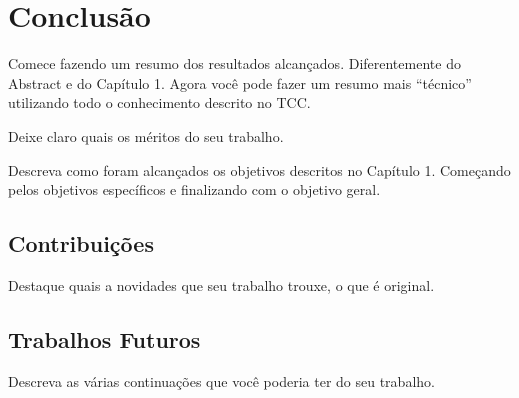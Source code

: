 \chapter{Conclusão}

Comece fazendo um resumo dos resultados alcançados. Diferentemente do Abstract e do Capítulo 1. Agora você pode fazer um resumo mais ``técnico'' utilizando todo o conhecimento descrito no TCC. 

Deixe claro quais os méritos do seu trabalho.

Descreva como foram alcançados os objetivos descritos no Capítulo 1. Começando pelos objetivos específicos e finalizando com o objetivo geral.

\section{Contribuições}
Destaque quais a novidades que seu trabalho trouxe, o que é original.

\section{Trabalhos Futuros}
Descreva as várias continuações que você poderia ter do seu trabalho.